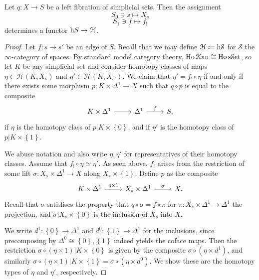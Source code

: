\begin{lemma}\label{2.1.1.6}
	Let $q : X \to S$ be a left fibration of simplicial sets. Then the assignment
	\[
		S_0\ni s\mapsto X_s
	\]
	\[
		S_1\ni f\mapsto f_!
	\]
	determines a functor $\mathrm{h} S\to \mathcal{H} $.
\end{lemma}
\begin{proof}
	Let $f : s \to s'$ be an edge of $S$. Recall that we may define $\mathcal{H} \coloneqq \mathrm{h} \mathcal{S} $ for $\mathcal{S} $ the $\infty $-category of spaces. By standard model category theory, $\operatorname{Ho} \mathcal{K} \mathrm{an} \cong \operatorname{Ho} \mathrm{s}\mathcal{S}\mathrm{et} $, so let $K$ be any simplicial set and consider homotopy classes of maps $\eta \in \mathcal{H} (K,X_s)$ and $\eta '\in \mathcal{H} (K,X_{s'} )$. We claim that $\eta '=f_! \circ \eta $ if and only if there exists some morphism $p : K\times \Delta ^1 \to X$ such that $q\circ p$ is equal to the composite
	\[\begin{tikzcd}[row sep = 2.5em, column sep = 2.5em]
	K\times \Delta ^1 \ar[r]  & \Delta ^1 \ar[" f ", r]  & S,
	\end{tikzcd}\]
	if $\eta $ is the homotopy class of $p|K\times \left\{ 0 \right\} $, and if $\eta '$ is the homotopy class of $p|K\times \left\{ 1 \right\} $.

	We abuse notation and also write $\eta ,\eta '$ for representatives of their homotopy classes. Assume that $f_!\circ \eta \simeq \eta '$. As seen above, $f_!$ arises from the restriction of some lift $\sigma : X_s\times \Delta ^1 \to X$ along $X_s\times \left\{ 1 \right\} $. Define $p$ as the composite
	\[\begin{tikzcd}[row sep = 2.5em, column sep = 2.5em]
	K\times \Delta ^1 \ar[" \eta \times 1 ", r]  & X_s\times \Delta ^1 \ar[" \sigma  ", r]  & X.
	\end{tikzcd}\]
	Recall that $\sigma $ satisfises the property that $q\circ \sigma =f\circ \pi $ for $\pi : X_s\times \Delta ^1 \to \Delta ^1$ the projection, and $\sigma |X_s\times \left\{ 0 \right\} $ is the inclusion of $X_s$ into $X$.

	We write $d^1 : \left\{ 0 \right\}  \to \Delta ^1$ and $d^0 : \left\{ 1 \right\}  \to \Delta ^1$ for the inclusions, since precomposing by $\Delta ^0 \cong \left\{ 0 \right\} ,\left\{ 1 \right\} $ indeed yields the coface maps. Then the restriction $\sigma \circ (\eta \times 1)|K\times \left\{ 0 \right\} $ is given by the composite $\sigma \circ (\eta \times d^1)$, and similarly $\sigma \circ (\eta \times 1)|K\times \left\{ 1 \right\} =\sigma \circ (\eta \times d^0)$. We show these are the homotopy types of $\eta $ and $\eta '$, respectively.


\end{proof}
